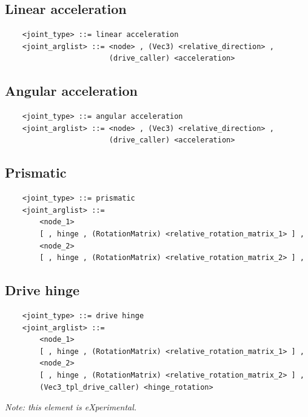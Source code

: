 \documentclass[10pt,dvips]{report}
\begin{document}
\subsection{Linear acceleration}
\begin{verbatim}
    <joint_type> ::= linear acceleration
    <joint_arglist> ::= <node> , (Vec3) <relative_direction> , 
                        (drive_caller) <acceleration>
\end{verbatim}

\subsection{Angular acceleration}
\begin{verbatim}
    <joint_type> ::= angular acceleration
    <joint_arglist> ::= <node> , (Vec3) <relative_direction> , 
                        (drive_caller) <acceleration>
\end{verbatim}

\subsection{Prismatic}
\begin{verbatim}
    <joint_type> ::= prismatic
    <joint_arglist> ::= 
        <node_1>
        [ , hinge , (RotationMatrix) <relative_rotation_matrix_1> ] ,
        <node_2> 
        [ , hinge , (RotationMatrix) <relative_rotation_matrix_2> ] ,    
\end{verbatim}

\subsection{Drive hinge}
\begin{verbatim}
    <joint_type> ::= drive hinge
    <joint_arglist> ::= 
        <node_1>
        [ , hinge , (RotationMatrix) <relative_rotation_matrix_1> ] ,
        <node_2> 
        [ , hinge , (RotationMatrix) <relative_rotation_matrix_2> ] ,
        (Vec3_tpl_drive_caller) <hinge_rotation>
\end{verbatim}
{\em
    Note: this element is eXperimental. 
}
  
\end{document}
